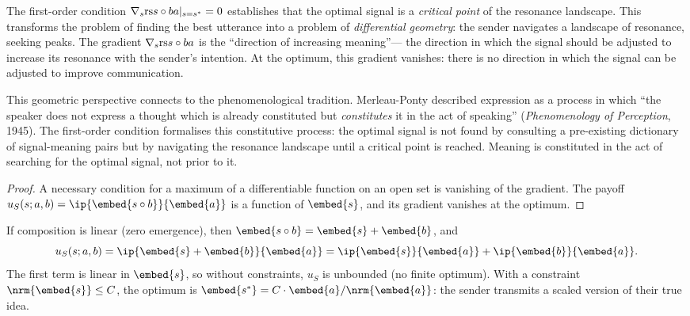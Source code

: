 \begin{interpretation}
\label{interp:ch14:foc_calculus_of_meaning}
The first-order condition $\nabla_s \mathrm{rs}{s \circ b}{a}|_{s=s^*} = 0$
establishes that the optimal signal is a \emph{critical point} of the
resonance landscape.  This transforms the problem of finding the best
utterance into a problem of \emph{differential geometry}: the sender
navigates a landscape of resonance, seeking peaks.  The gradient
$\nabla_s \mathrm{rs}{s \circ b}{a}$ is the ``direction of increasing meaning''---
the direction in which the signal should be adjusted to increase its
resonance with the sender's intention.  At the optimum, this gradient
vanishes: there is no direction in which the signal can be adjusted to
improve communication.

This geometric perspective connects to the phenomenological tradition.
Merleau-Ponty described expression as a process in which ``the speaker does
not express a thought which is already constituted but \emph{constitutes} it
in the act of speaking'' (\emph{Phenomenology of Perception}, 1945).  The
first-order condition formalises this constitutive process: the optimal
signal is not found by consulting a pre-existing dictionary of
signal-meaning pairs but by navigating the resonance landscape until a
critical point is reached.  Meaning is constituted in the act of searching
for the optimal signal, not prior to it.
\end{interpretation}



\begin{proof}
A necessary condition for a maximum of a differentiable function on an open
set is vanishing of the gradient.  The payoff $u_S(s; a, b) = \ip{\embed{s \compose b}}{\embed{a}}$ is a function of $\embed{s}$, and its gradient
vanishes at the optimum.
\end{proof}

\begin{proposition}
\label{prop:linear-eq}
If composition is linear (zero emergence), then $\embed{s \compose b} = \embed{s} + \embed{b}$, and
\[
  u_S(s; a, b) = \ip{\embed{s} + \embed{b}}{\embed{a}}
  = \ip{\embed{s}}{\embed{a}} + \ip{\embed{b}}{\embed{a}}.
\]
The first term is linear in $\embed{s}$, so without constraints, $u_S$ is
unbounded (no finite optimum).  With a constraint
$\nrm{\embed{s}} \leq C$, the optimum is
$\embed{s^*} = C \cdot \embed{a} / \nrm{\embed{a}}$: the sender transmits
a scaled version of their true idea.
\end{proposition}

